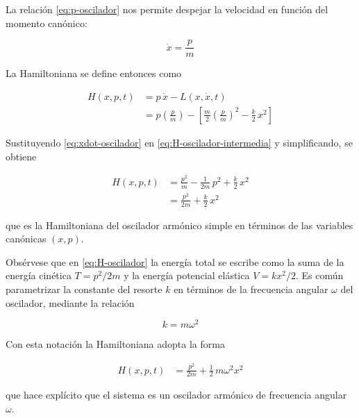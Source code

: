 \documentclass{article}
\begin{document}
La relación \eqref{eq:p-oscilador} nos permite despejar la velocidad en función
del momento canónico:

\begin{equation}
\dot{x} = \frac{p}{m}
\label{eq:xdot-oscilador}
\end{equation}

La Hamiltoniana se define entonces como

\begin{equation}
\begin{split}
H(x,p,t)
&= p\,\dot{x} - L(x,\dot{x},t) \\[4pt]
&= p\left(\frac{p}{m}\right)
   - \left[\frac{m}{2}\left(\frac{p}{m}\right)^{2}
     - \frac{k}{2}\,x^{2}\right]
\end{split}
\label{eq:H-oscilador-intermedia}
\end{equation}

Sustituyendo \eqref{eq:xdot-oscilador} en \eqref{eq:H-oscilador-intermedia} y
simplificando, se obtiene

\begin{equation}
\begin{split}
H(x,p,t)
&= \frac{p^{2}}{m}
   - \frac{1}{2m}\,p^{2}
   + \frac{k}{2}\,x^{2} \\[4pt]
&= \frac{p^{2}}{2m} + \frac{k}{2}\,x^{2}
\end{split}
\label{eq:H-oscilador}
\end{equation}

que es la Hamiltoniana del oscilador armónico simple en términos de
las variables canónicas $(x,p)$.

Obsérvese que en \eqref{eq:H-oscilador} la energía total se escribe como la suma
de la energía cinética $T = p^{2}/2m$ y la energía potencial elástica
$V = kx^{2}/2$. Es común parametrizar la constante del resorte $k$ en términos
de la frecuencia angular $\omega$ del oscilador, mediante la relación

\[
k = m\omega^{2}
\]

Con esta notación la Hamiltoniana adopta la forma

\begin{equation}
\begin{split}
H(x,p,t) &= \frac{p^{2}}{2m} + \frac{1}{2}\,m\omega^{2}x^{2}
\end{split}
\label{eq:H-oscilador-omega}
\end{equation}

que hace explícito que el sistema es un oscilador armónico de frecuencia
angular $\omega$.
\end{document}
